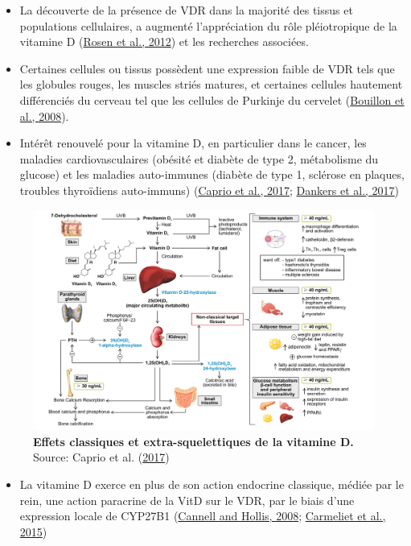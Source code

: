 \documentclass[
  a4paper,
  DIV=11,
  numbers=noendperiod,
  listof=totoc]{scrreprt}
\providecommand{\tightlist}{%
  \setlength{\itemsep}{0pt}\setlength{\parskip}{0pt}}\usepackage{longtable,booktabs,array}
\begin{document}
\begin{itemize}
\item
  La découverte de la présence de VDR dans la majorité des tissus et
  populations cellulaires, a augmenté l'appréciation du rôle
  pléiotropique de la vitamine D
  (\protect\hyperlink{ref-Rosen.2012}{Rosen et al., 2012}) et les
  recherches associées.
\item
  Certaines cellules ou tissus possèdent une expression faible de VDR
  tels que les globules rouges, les muscles striés matures, et certaines
  cellules hautement différenciés du cerveau tel que les cellules de
  Purkinje du cervelet (\protect\hyperlink{ref-Bouillon.2008}{Bouillon
  et al., 2008}).
\item
  Intérêt renouvelé pour la vitamine D, en particulier dans le cancer,
  les maladies cardiovasculaires (obésité et diabète de type 2,
  métabolisme du glucose) et les maladies auto-immunes (diabète de type
  1, sclérose en plaques, troubles thyroïdiens auto-immuns)
  (\protect\hyperlink{ref-Caprio.2017}{Caprio et al., 2017};
  \protect\hyperlink{ref-Dankers.2017}{Dankers et al., 2017})
\end{itemize}

\begin{figure}

{\centering \includegraphics{figures/extra-skeletal-effect.png}

}

\caption{\label{fig-extra-skeletal}\textbf{Effets classiques et
extra-squelettiques de la vitamine D.} Source: Caprio et al.
(\protect\hyperlink{ref-Caprio.2017}{2017})}

\end{figure}

\begin{itemize}
\tightlist
\item
  La vitamine D exerce en plus de son action endocrine classique, médiée
  par le rein, une action paracrine de la VitD sur le VDR, par le biais
  d'une expression locale de CYP27B1
  (\protect\hyperlink{ref-Cannell.2008}{Cannell and Hollis, 2008};
  \protect\hyperlink{ref-Carmeliet.2015}{Carmeliet et al., 2015})
\end{itemize}
\end{document}
